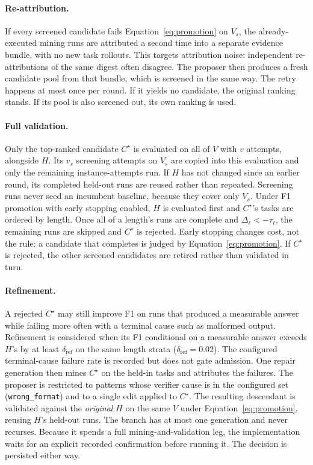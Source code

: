 \paragraph{Re-attribution.}
If every screened candidate fails Equation~\ref{eq:promotion} on $V_s$, the
already-executed mining runs are attributed a second time into a separate
evidence bundle, with no new task rollouts. This targets attribution noise:
independent re-attributions of the same digest often disagree. The proposer
then produces a fresh candidate pool from that bundle, which is screened in the
same way. The retry happens at most once per round. If it yields no candidate,
the original ranking stands. If its pool is also screened out, its own ranking
is used.

\paragraph{Full validation.}
Only the top-ranked candidate $C^\star$ is evaluated on all of $V$ with $v$
attempts, alongside $H$. Its $v_s$ screening attempts on $V_s$ are copied into
this evaluation and only the remaining instance-attempts run. If $H$ has not
changed since an earlier round, its completed held-out runs are reused rather
than repeated. Screening runs never seed an incumbent baseline, because they
cover only $V_s$. Under F1 promotion with early stopping enabled, $H$ is
evaluated first and $C^\star$'s tasks are ordered by length. Once all
of a length's runs are complete and $\Delta_\ell<-\tau_\ell$, the remaining
runs are skipped and $C^\star$ is rejected. Early stopping changes cost, not
the rule: a candidate that completes is judged by
Equation~\ref{eq:promotion}. If $C^\star$ is rejected, the other screened
candidates are retired rather than validated in turn.

\paragraph{Refinement.}
A rejected $C^\star$ may still improve F1 on runs that produced a measurable
answer while failing more often with a terminal cause such as malformed
output. Refinement is considered when its F1 conditional on a measurable answer
exceeds $H$'s by at least $\delta_{\mathrm{ref}}$ on the same length strata
($\delta_{\mathrm{ref}}=0.02$). The configured terminal-cause failure rate is
recorded but does not gate admission. One repair generation then mines
$C^\star$ on the held-in tasks and attributes the failures. The proposer is
restricted to patterns whose verifier cause is in the configured set
(\texttt{wrong\_format}) and to a single edit applied to $C^\star$. The
resulting descendant is validated against the \emph{original} $H$ on the same
$V$ under Equation~\ref{eq:promotion}, reusing $H$'s held-out runs. The branch
has at most one generation and never recurses. Because it spends a full
mining-and-validation leg, the implementation waits for an explicit recorded
confirmation before running it. The decision is persisted either way.

